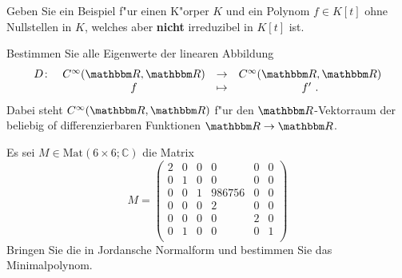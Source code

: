 \documentclass[a4,11pt]{article}
\begin{document}
{
\kopf
}


\newpage

\begin{aufgabe}[4 Punkte]
  Geben Sie ein Beispiel f"ur einen K"orper $K$ und ein Polynom $f \in K[t]$ ohne
  Nullstellen in $K$, welches aber {\bfseries nicht} irreduzibel in $K[t]$ ist.
\end{aufgabe}

\newpage

\begin{aufgabe}[4 Punkte]
  Bestimmen Sie alle Eigenwerte der linearen Abbildung
  $$ \begin{array}{rccc}
       D \colon & C^\infty(\R,\R) &\to& C^\infty(\R,\R) \\
       & f &\mapsto& f' \ .
  \end{array} $$
  Dabei steht $C^\infty(\R,\R)$ f"ur den $\R$-Vektorraum der
  beliebig of differenzierbaren Funktionen $\R \to \R$.
\end{aufgabe}

\newpage

\begin{aufgabe}

Es sei $M \in \text{Mat}(6 \times 6; \mathbb{C})$ die Matrix
\[
M = 
\begin{pmatrix}
2 & 0 & 0 & 0 & 0 & 0 \\
0 & 1 & 0 & 0 & 0 & 0 \\
0 & 0 & 1 & 986756 & 0 & 0 \\
0 & 0 & 0 & 2 & 0 & 0 \\
0 & 0 & 0 & 0 & 2 & 0 \\
0 & 1 & 0 & 0 & 0 & 1 \\
\end{pmatrix}
\]
  Bringen Sie die in Jordansche Normalform und bestimmen Sie das Minimalpolynom.

  
\end{aufgabe}


   
\end{document}
